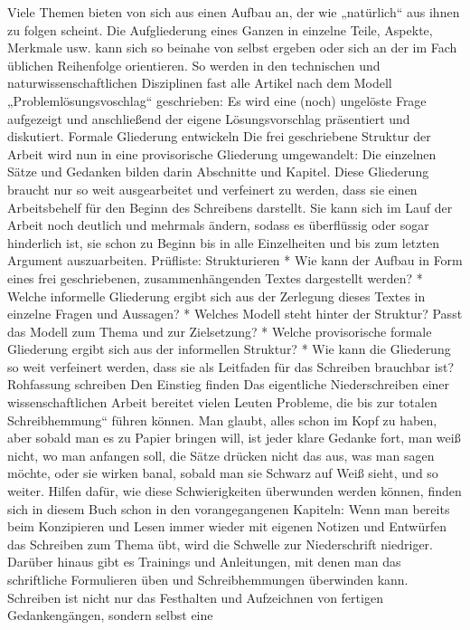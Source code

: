 \documentclass[]{book}
\theoremstyle{definition}
\theoremstyle{definition}
\theoremstyle{definition}
\theoremstyle{remark}
\begin{document}
Viele Themen bieten von sich aus einen Aufbau an, der wie „natürlich``
aus ihnen zu folgen scheint. Die Aufgliederung eines Ganzen in einzelne
Teile, Aspekte, Merkmale usw. kann sich so beinahe von selbst ergeben
oder sich an der im Fach üblichen Reihenfolge orientieren. So werden in
den technischen und naturwissenschaftlichen Disziplinen fast alle
Artikel nach dem Modell „Problemlösungsvoschlag`` geschrieben: Es wird
eine (noch) ungelöste Frage aufgezeigt und anschließend der eigene
Lösungsvorschlag präsentiert und diskutiert. Formale Gliederung
entwickeln Die frei geschriebene Struktur der Arbeit wird nun in eine
provisorische Gliederung umgewandelt: Die einzelnen Sätze und Gedanken
bilden darin Abschnitte und Kapitel. Diese Gliederung braucht nur so
weit ausgearbeitet und verfeinert zu werden, dass sie einen
Arbeitsbehelf für den Beginn des Schreibens darstellt. Sie kann sich im
Lauf der Arbeit noch deutlich und mehrmals ändern, sodass es überflüssig
oder sogar hinderlich ist, sie schon zu Beginn bis in alle Einzelheiten
und bis zum letzten Argument auszuarbeiten. Prüfliste: Strukturieren *
Wie kann der Aufbau in Form eines frei geschriebenen, zusammenhängenden
Textes dargestellt werden? * Welche informelle Gliederung ergibt sich
aus der Zerlegung dieses Textes in einzelne Fragen und Aussagen? *
Welches Modell steht hinter der Struktur? Passt das Modell zum Thema und
zur Zielsetzung? * Welche provisorische formale Gliederung ergibt sich
aus der informellen Struktur? * Wie kann die Gliederung so weit
verfeinert werden, dass sie als Leitfaden für das Schreiben brauchbar
ist? Rohfassung schreiben Den Einstieg finden Das eigentliche
Niederschreiben einer wissenschaftlichen Arbeit bereitet vielen Leuten
Probleme, die bis zur totalen Schreibhemmung`` führen können. Man
glaubt, alles schon im Kopf zu haben, aber sobald man es zu Papier
bringen will, ist jeder klare Gedanke fort, man weiß nicht, wo man
anfangen soll, die Sätze drücken nicht das aus, was man sagen möchte,
oder sie wirken banal, sobald man sie Schwarz auf Weiß sieht, und so
weiter. Hilfen dafür, wie diese Schwierigkeiten überwunden werden
können, finden sich in diesem Buch schon in den vorangegangenen
Kapiteln: Wenn man bereits beim Konzipieren und Lesen immer wieder mit
eigenen Notizen und Entwürfen das Schreiben zum Thema übt, wird die
Schwelle zur Niederschrift niedriger. Darüber hinaus gibt es Trainings
und Anleitungen, mit denen man das schriftliche Formulieren üben und
Schreibhemmungen überwinden kann. Schreiben ist nicht nur das Festhalten
und Aufzeichnen von fertigen Gedankengängen, sondern selbst eine
\end{document}
